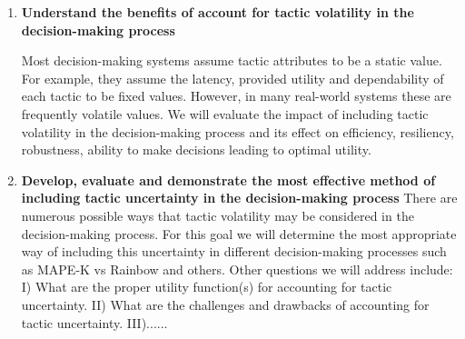 \documentclass{article}
\newcommand{\dan}[1]{\textcolor{blue}{{\it [Dan says: #1]}}}
\begin{document}
\begin{enumerate}[noitemsep]
	\item \textbf{Understand the benefits of account for tactic volatility in the decision-making process} %
    
Most decision-making systems assume tactic attributes to be a static value. For example, they assume the latency, provided utility and dependability of each tactic to be fixed values. However, in many real-world systems these are frequently volatile values. We will evaluate the impact of including tactic volatility in the decision-making process and its effect on efficiency, resiliency, robustness, ability to make decisions leading to optimal utility. 
    
    
 
 
  	\item \textbf{Develop, evaluate and demonstrate the most effective method of including tactic uncertainty in the decision-making process} There are numerous possible ways that tactic volatility may be considered in the decision-making process. For this goal we will determine the most appropriate way of including this uncertainty in different decision-making processes such as MAPE-K vs Rainbow and others. Other questions we will address include: I) What are the proper utility function(s) for accounting for tactic uncertainty. II) What are the challenges and drawbacks of accounting for tactic uncertainty.  III)...... %
    
    
    
    
    
    
    
\end{enumerate}
\end{document}
